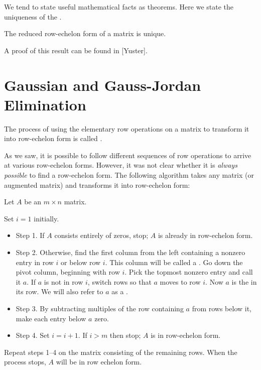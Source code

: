 \documentclass{ximera}
\begin{document}
 We tend to state useful mathematical facts as theorems. Here we state the uniqueness of the \rref.

 
\begin{theorem}\label{th:uniquenessofrref} The reduced row-echelon form of a matrix is unique.
\end{theorem}
A proof of this result can be found in [Yuster].
 
\section*{Gaussian and Gauss-Jordan Elimination}
 
\begin{definition}\label{def:GaussianElimination}
The process of using the elementary row operations on a matrix to transform it into row-echelon form is called .
\end{definition}
 
As we saw, it is possible to follow different sequences of row operations to arrive at various row-echelon forms.  However, it was not clear whether it is {\it always possible} to find a row-echelon form.  The following algorithm takes any matrix (or augmented matrix) and transforms it into row-echelon form:
\begin{algorithm} \label{alg:gaussian}
Let $A$ be an $m\times n$ matrix.

 
Set $i=1$ initially.
\begin{itemize}
\item[] Step 1. If $A$ consists entirely of zeros, stop;  $A$ is already in row-echelon form.
 
\item[] Step 2. Otherwise, find the first column from the left containing a nonzero entry in row $i$ or below row $i$.  This column will be called a .  Go down the pivot column, beginning with row $i$. Pick the topmost nonzero entry and call it $a$. If $a$ is not in row $i$, switch rows so that $a$ moves to row $i$.  Now $a$ is the  in its row.  We will also refer to $a$ as a . 
 
\item[] Step 3. By subtracting multiples of the row containing $a$ from rows below it, make each entry below $a$ zero.
 
\item[] Step 4.  Set $i=i+1$.  If $i > m$ then stop; $A$ is in row-echelon form.
 
\end{itemize}
 
Repeat steps 1--4 on the matrix consisting of the remaining rows.
When the process stops, $A$ will be in row echelon form.
\end{algorithm}
\end{document}
